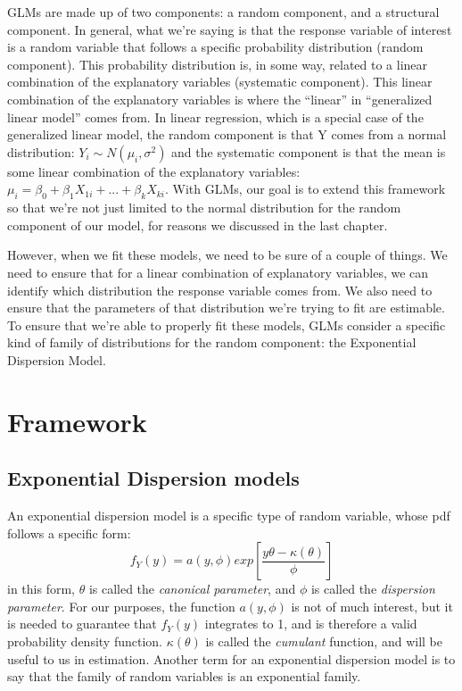 \documentclass[
]{book}
\begin{document}
GLMs are made up of two components: a random component, and a structural component. In general, what we're saying is that the response variable of interest is a random variable that follows a specific probability distribution (random component). This probability distribution is, in some way, related to a linear combination of the explanatory variables (systematic component). This linear combination of the explanatory variables is where the ``linear'' in ``generalized linear model'' comes from. In linear regression, which is a special case of the generalized linear model, the random component is that Y comes from a normal distribution: \(Y_i\sim N(\mu_i,\sigma^2)\) and the systematic component is that the mean is some linear combination of the explanatory variables: \(\mu_i=\beta_0+\beta_1X_{1i}+...+\beta_kX_{ki}\). With GLMs, our goal is to extend this framework so that we're not just limited to the normal distribution for the random component of our model, for reasons we discussed in the last chapter.

However, when we fit these models, we need to be sure of a couple of things. We need to ensure that for a linear combination of explanatory variables, we can identify which distribution the response variable comes from. We also need to ensure that the parameters of that distribution we're trying to fit are estimable. To ensure that we're able to properly fit these models, GLMs consider a specific kind of family of distributions for the random component: the Exponential Dispersion Model.

\hypertarget{framework}{%
\section{Framework}\label{framework}}

\hypertarget{exponential-dispersion-models}{%
\subsection{Exponential Dispersion models}\label{exponential-dispersion-models}}

An exponential dispersion model is a specific type of random variable, whose pdf follows a specific form:
\[
f_{Y}(y) = a(y,\phi)exp\left[\frac{y\theta - \kappa(\theta)}{\phi}   \right]
\]
in this form, \(\theta\) is called the \emph{canonical parameter}, and \(\phi\) is called the \emph{dispersion parameter}. For our purposes, the function \(a(y,\phi)\) is not of much interest, but it is needed to guarantee that \(f_Y(y)\) integrates to 1, and is therefore a valid probability density function. \(\kappa(\theta)\) is called the \emph{cumulant} function, and will be useful to us in estimation. Another term for an exponential dispersion model is to say that the family of random variables is an exponential family.
\end{document}
